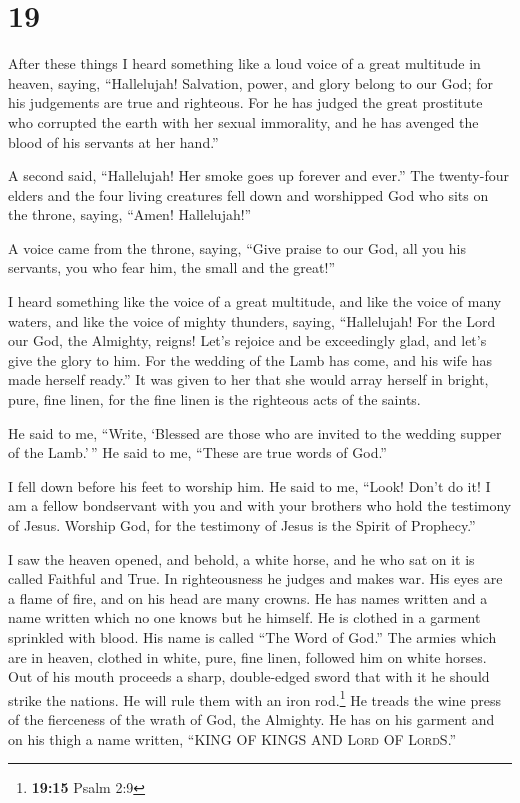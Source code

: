 \hypertarget{section-18}{%
\section{19}\label{section-18}}

 After these things I heard something like a loud voice of
a great multitude in heaven, saying, ``Hallelujah! Salvation, power, and
glory belong to our God;  for his judgements are true and
righteous. For he has judged the great prostitute who corrupted the
earth with her sexual immorality, and he has avenged the blood of his
servants at her hand.''

 A second said, ``Hallelujah! Her smoke goes up forever
and ever.''  The twenty-four elders and the four living
creatures fell down and worshipped God who sits on the throne, saying,
``Amen! Hallelujah!''

 A voice came from the throne, saying, ``Give praise to
our God, all you his servants, you who fear him, the small and the
great!''

 I heard something like the voice of a great multitude,
and like the voice of many waters, and like the voice of mighty
thunders, saying, ``Hallelujah! For the Lord our God, the Almighty,
reigns!  Let's rejoice and be exceedingly glad, and let's
give the glory to him. For the wedding of the Lamb has come, and his
wife has made herself ready.''  It was given to her that
she would array herself in bright, pure, fine linen, for the fine linen
is the righteous acts of the saints.

 He said to me, ``Write, `Blessed are those who are
invited to the wedding supper of the Lamb.'\,'' He said to me, ``These
are true words of God.''

 I fell down before his feet to worship him. He said to
me, ``Look! Don't do it! I am a fellow bondservant with you and with
your brothers who hold the testimony of Jesus. Worship God, for the
testimony of Jesus is the Spirit of Prophecy.''

 I saw the heaven opened, and behold, a white horse, and
he who sat on it is called Faithful and True. In righteousness he judges
and makes war.  His eyes are a flame of fire, and on his
head are many crowns. He has names written and a name written which no
one knows but he himself.  He is clothed in a garment
sprinkled with blood. His name is called ``The Word of God.''
 The armies which are in heaven, clothed in white, pure,
fine linen, followed him on white horses.  Out of his
mouth proceeds a sharp, double-edged sword that with it he should strike
the nations. He will rule them with an iron rod.\footnote{\textbf{19:15}
  Psalm 2:9} He treads the wine press of the fierceness of the wrath of
God, the Almighty.  He has on his garment and on his
thigh a name written, ``KING OF KINGS AND \textsc{Lord} OF
\textsc{Lord}S.''

